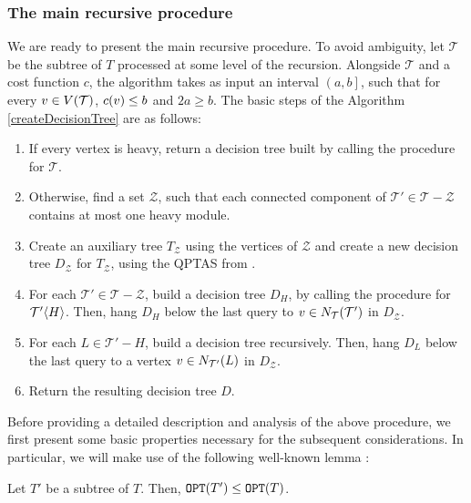 \subsubsection{The main recursive procedure}\label{mainRecursiveProcedure}

We are ready to present the main recursive procedure. To avoid ambiguity, let $\mathcal{T}$ be the subtree of $T$ processed at some level of the recursion. Alongside $\mathcal{T}$ and a cost function $c$, the algorithm takes as input an interval $\left(a,b\right]$, such that for every $v\in V\mathopen{}\left( \mathcal{T} \right)$, $c\mathopen{}\left( v \right)\leq b$ and $2a\geq b$. 
The basic steps of the Algorithm \ref{createDecisionTree} are as follows: 
\begin{enumerate}
    \item If every vertex is heavy, return a decision tree built by calling the \FRankingBasedDT procedure for $\mathcal{T}$.
    \item Otherwise, find a set $\mathcal{Z}$, such that each connected component of $\mathcal{T}'\in \mathcal{T}-\mathcal{Z}$ contains at most one heavy module.
    \item Create an auxiliary tree $T_{\mathcal{Z}}$ using the vertices of $\mathcal{Z}$ and create a new decision tree $D_{\mathcal{Z}}$ for $T_{\mathcal{Z}}$, using the QPTAS from \cite{dereniowski2017ApproxSsForGeneralBSinWTs}.
    \item For each $\mathcal{T}'\in \mathcal{T}-\mathcal{Z}$, build a decision tree $D_H$, by calling the \FRankingBasedDT procedure for $\mathcal{T}'\mathopen{}\langle H \rangle$. Then, hang $D_H$ below the last query to $v\in N_{\mathcal{T}}\mathopen{}\left( \mathcal{T}' \right)$ in $D_{\mathcal{Z}}$.
    \item For each $L\in\mathcal{T}'-H$, build a decision tree recursively. Then, hang $D_L$ below the last query to a vertex $v \in N_{\mathcal{T'}}\mathopen{}\left( L \right)$ in $D_{\mathcal{Z}}$.
    \item Return the resulting decision tree $D$.
\end{enumerate}

Before providing a detailed description and analysis of the above procedure, we first present some basic properties necessary for the subsequent considerations. In particular, we will make use of the following well-known lemma \cite{Cicalese2016DecTreesSimEval}:
\begin{lemma}\label{subtreeOptLemma}
    Let $T'$ be a subtree of $T$. Then, $\texttt{OPT}\mathopen{}\left( T' \right)\leq\texttt{OPT}\mathopen{}\left( T \right)$.
\end{lemma}


